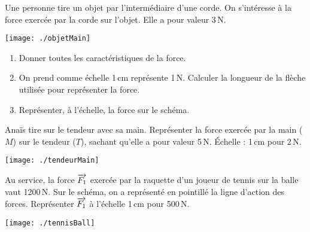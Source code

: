 \begin{exercice}[]
\label{representeVecteur}

Une personne tire un objet par l'intermédiaire d'une corde. On s'intéresse à la force exercée par la corde sur l'objet. Elle a pour valeur 3\,N.

\vspace{1em}
\begin{center}
    \texttt{[image: ./objetMain]}   
\end{center}

\begin{enumerate}
\item Donner toutes les caractéristiques de la force.
\item On prend comme échelle 1\,cm représente 1\,N. Calculer la longueur de la flèche utilisée pour représenter la force.  
\item Représenter, à l'échelle, la force sur le schéma.
\end{enumerate}


\end{exercice}






\begin{exercice}
Anaïs tire sur le tendeur avec sa main. Représenter la force exercée par la main ($M$) sur le tendeur ($T$), sachant qu'elle a pour valeur 5\,N. Échelle : 1\,cm pour 2\,N.  

\vspace{1em}
\begin{center}
    \texttt{[image: ./tendeurMain]}   
\end{center}

\end{exercice}







\begin{exercice}
Au service, la force $\overrightarrow{F_1}$ exercée par la raquette d'un joueur de tennis sur la balle vaut 1200\,N. Sur le schéma, on a représenté en pointillé la ligne d'action des forces. Représenter $\overrightarrow{F_1}$ à l'échelle 1\,cm pour 500\,N.

\vspace{1em}
\begin{center}
    \texttt{[image: ./tennisBall]}   
\end{center}

\end{exercice}

